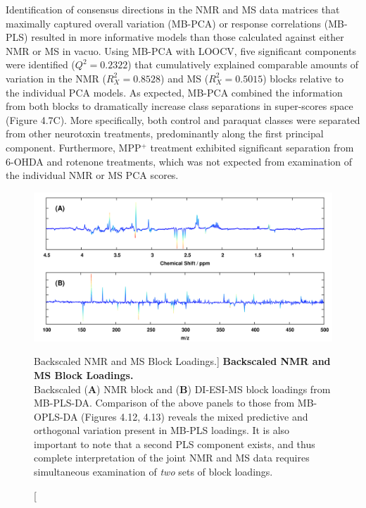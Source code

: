 \begin{doublespace}
Identification of consensus directions in the NMR and MS data matrices that
maximally captured overall variation (MB-PCA) or response correlations (MB-PLS)
resulted in more informative models than those calculated against either NMR
or MS in vacuo. Using MB-PCA with LOOCV, five significant components were
identified ($Q^2 = 0.2322$) that cumulatively explained comparable amounts
of variation in the NMR ($R^2_X = 0.8528$) and MS ($R^2_X = 0.5015$) blocks
relative to the individual PCA models. As expected, MB-PCA combined the
information from both blocks to dramatically increase class separations in
super-scores space (Figure 4.7C). More specifically, both control and paraquat
classes were separated from other neurotoxin treatments, predominantly along
the first principal component. Furthermore, MPP$^+$ treatment exhibited
significant separation from 6-OHDA and rotenone treatments, which was not
expected from examination of the individual NMR or MS PCA scores.
\end{doublespace}

\begin{figure}[ht!]
\includegraphics[width=6.5in]{figs/apps/11-mbpls-p.png}
\caption
      [Backscaled NMR and MS Block Loadings.]{
  {\bf Backscaled NMR and MS Block Loadings.}
  \\
  Backscaled ({\bf A}) \hnmr{} NMR block and ({\bf B}) DI-ESI-MS block loadings
  from MB-PLS-DA. Comparison of the above panels to those from MB-OPLS-DA
  (Figures 4.12, 4.13) reveals the mixed predictive and orthogonal variation
  present in MB-PLS loadings. It is also important to note that a second
  PLS component exists, and thus complete interpretation of the joint NMR
  and MS data requires simultaneous examination of \emph{two} sets of
  block loadings.
}
\label{figure.4.11}
\end{figure}


